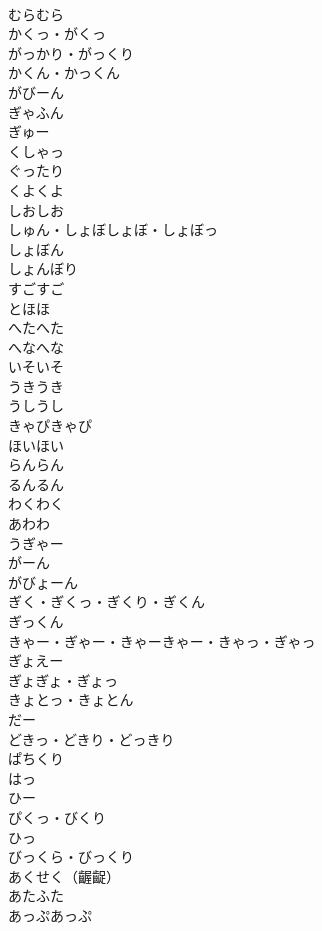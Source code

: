 \documentclass[8pt]{extreport}
\begin{document}
\begin{CJK}{UTF8}{min}
\\	むらむら	
\\	かくっ・がくっ	
\\	がっかり・がっくり	
\\	かくん・かっくん	
\\	がびーん	
\\	ぎゃふん	
\\	ぎゅー	
\\	くしゃっ	
\\	ぐったり	
\\	くよくよ	
\\	しおしお	
\\	しゅん・しょぼしょぼ・しょぼっ	
\\	しょぼん	
\\	しょんぼり	
\\	すごすご	
\\	とほほ	
\\	へたへた	
\\	へなへな	
\\	いそいそ	
\\	うきうき	
\\	うしうし	
\\	きゃぴきゃぴ	
\\	ほいほい	
\\	らんらん	
\\	るんるん	
\\	わくわく	
\\	あわわ	
\\	うぎゃー	
\\	がーん	
\\	がびょーん	
\\	ぎく・ぎくっ・ぎくり・ぎくん	
\\	ぎっくん	
\\	きゃー・ぎゃー・きゃーきゃー・きゃっ・ぎゃっ	
\\	ぎょえー	
\\	ぎょぎょ・ぎょっ	
\\	きょとっ・きょとん	
\\	だー	
\\	どきっ・どきり・どっきり	
\\	ぱちくり	
\\	はっ	
\\	ひー	
\\	ぴくっ・びくり	
\\	ひっ	
\\	びっくら・びっくり	
\\	あくせく（齷齪）	
\\	あたふた	
\\	あっぷあっぷ	

\end{CJK}
\end{document}
